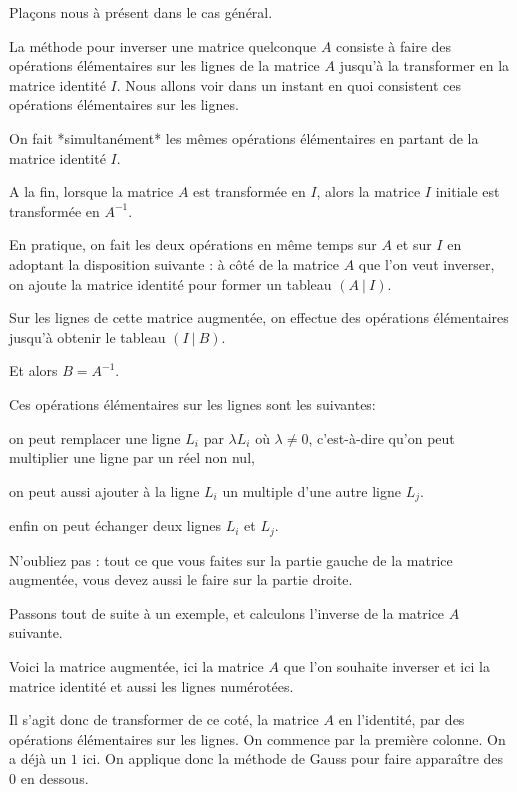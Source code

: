\diapo

Plaçons nous à présent dans le cas général.

\change
La méthode pour inverser une matrice quelconque $A$ consiste à faire des opérations élémentaires sur les lignes de la matrice $A$ jusqu'à la transformer en la matrice identité $I$. Nous allons voir dans un instant en quoi consistent ces opérations élémentaires sur les lignes.

\change
On fait *simultanément* les mêmes opérations élémentaires en partant de la matrice identité $I$. 

\change
A la fin, lorsque la matrice $A$ est transformée en $I$, alors la matrice $I$ initiale est transformée en $A^{-1}$. 

\change
En pratique, on fait les deux opérations en même temps sur $A$ et sur $I$ en adoptant la disposition suivante : à côté de la matrice $A$ que l'on veut inverser, on ajoute la matrice identité pour former un tableau $(A\ |\ I)$. 

\change
Sur les lignes de cette matrice augmentée, on effectue des opérations élémentaires jusqu'à obtenir le tableau $(I\ |\ B)$. 

\change
Et alors $B=A^{-1}$.

\change
Ces opérations élémentaires sur les lignes sont les suivantes:

\change
on peut remplacer une ligne $L_i$ par $\lambda L_i$ où $\lambda\neq 0$, c'est-à-dire qu'on peut multiplier une ligne par un réel non nul,
    
\change
on peut aussi ajouter à la ligne $L_i$ un multiple d'une autre ligne $L_j$.
  
\change
enfin on peut échanger deux lignes $L_i$ et $L_j$.


N'oubliez pas : tout ce que vous faites sur la partie gauche de la matrice augmentée, vous devez aussi le faire sur la partie droite.


\diapo

Passons tout de suite à un exemple, et calculons l'inverse de la matrice $A$ suivante.

\change
Voici la matrice augmentée, ici la matrice $A$ que l'on souhaite inverser
et ici la matrice identité et aussi les lignes numérotées.

Il s'agit donc de transformer de ce coté, la matrice $A$ en l'identité, 
par des opérations élémentaires sur les lignes. 
On commence par la première colonne. On a déjà un $1$ ici. 
On applique donc la méthode de Gauss pour faire apparaître des $0$ en dessous.

